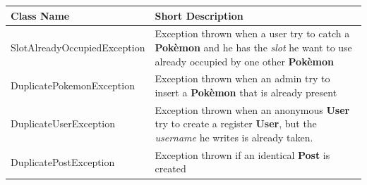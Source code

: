 \begingroup
\setlength{\tabcolsep}{10pt} %
\renewcommand{\arraystretch}{1.5} %
\begin{center}
	\begin{longtable}{| m{14em} | m{19em} |} 
		\hline
		\textbf{Class Name} & \textbf{Short Description} \\ [0.5ex] 
		\hline
		SlotAlreadyOccupiedException & Exception thrown when a user try to catch a \textbf{Pokèmon} and he has the \textit{slot} he want to use already occupied by one other \textbf{Pokèmon}\\ 
		\hline
		DuplicatePokemonException & Exception thrown when an admin try to insert a \textbf{Pokèmon} that is already present\\ 
		\hline
		DuplicateUserException & Exception thrown when an anonymous \textbf{User} try to create a register \textbf{User}, but the \textit{username} he writes is already taken.\\ 
		\hline
		DuplicatePostException & Exception thrown if an identical \textbf{Post} is created\\ 
		\hline
	\end{longtable}
\end{center}
\endgroup

